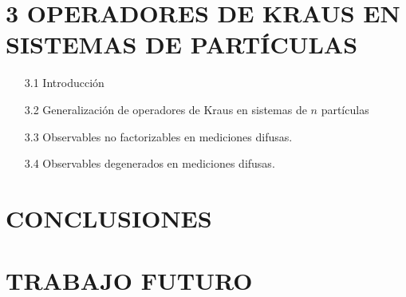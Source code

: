 \section*{3 OPERADORES DE KRAUS EN SISTEMAS DE \texorpdfstring{}{n} PARTÍCULAS}
\begin{itemize}
\item[3.1] Introducción
\item[3.2] Generalización de operadores de Kraus en sistemas de $n$ partículas
\item[3.3] Observables no factorizables en mediciones difusas.
\item[3.4] Observables degenerados en mediciones difusas.  
\end{itemize}




\section*{CONCLUSIONES }

\section*{TRABAJO FUTURO}
